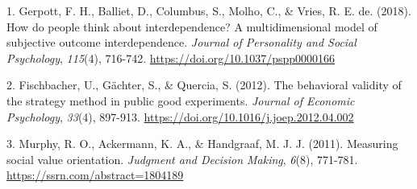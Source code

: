 \documentclass[
  spanish,
  10pt,
]{article}
\newlength{\cslhangindent}
\newenvironment{CSLReferences}[2] %
 {\begin{list}{}{%
  \setlength{\itemindent}{0pt}
  \setlength{\leftmargin}{0pt}
  \setlength{\parsep}{0pt}
  \ifodd #1
   \setlength{\leftmargin}{\cslhangindent}
   \setlength{\itemindent}{-1\cslhangindent}
  \fi
  \setlength{\itemsep}{#2\baselineskip}}}
 {\end{list}}
\begin{document}
\label{refs}
\begin{CSLReferences}{1}{0}
1. Gerpott, F. H., Balliet, D., Columbus, S., Molho, C., \& Vries, R. E.
de. (2018). How do people think about interdependence? A
multidimensional model of subjective outcome interdependence.
\emph{Journal of Personality and Social Psychology}, \emph{115}(4),
716-742. \url{https://doi.org/10.1037/pspp0000166}

2. Fischbacher, U., Gächter, S., \& Quercia, S. (2012). The behavioral
validity of the strategy method in public good experiments.
\emph{Journal of Economic Psychology}, \emph{33}(4), 897-913.
\url{https://doi.org/10.1016/j.joep.2012.04.002}

3. Murphy, R. O., Ackermann, K. A., \& Handgraaf, M. J. J. (2011).
Measuring social value orientation. \emph{Judgment and Decision Making},
\emph{6}(8), 771-781. \url{https://ssrn.com/abstract=1804189}

\end{CSLReferences}
\end{document}
